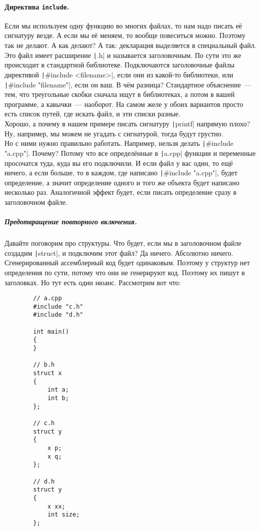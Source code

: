 \documentclass{article}
\begin{document}
    \paragraph{Директива \texttt{include}.}
    Если мы используем одну функцию во многих файлах, то нам надо писать её сигнатуру везде. А если мы её меняем, то вообще повеситься можно. Поэтому так не делают. А как делают? А так: декларация выделяется в специальный файл. Это файл имеет расширение \texttt|.h| и называется заголовочным. По сути это же происходит в стандартной библиотеке. Подключаются заголовочные файлы директивой \texttt|#include <filename>|, если они из какой-то библиотеки, или \texttt|#include "filename"|, если он ваш. В чём разница? Стандартное объяснение~--- тем, что треугольные скобки сначала ищут в библиотеках, а потом в вашей программе, а кавычки~--- наоборот. На самом желе у обоих вариантов просто есть список путей, где искать файл, и эти списки разные.\\
    Хорошо, а почему в нашем примере писать сигнатуру \texttt|printf| напрямую плохо? Ну, например, мы можем не угадать с сигнатурой, тогда будут грустно.\\
    Но с ними нужно правильно работать. Например, нельзя делать \texttt|#include "a.cpp"|. Почему? Потому что все определённые в \texttt|a.cpp| функции и переменные просочатся туда, куда вы его подключили. И если файл у вас один, то ещё ничего, а если больше, то в каждом, где написано \texttt|#include "a.cpp"|, будет определение, а значит определение одного и того же объекта будет написано несколько раз. Аналогичной эффект будет, если писать определение сразу в заголовочном файле.
    \subparagraph{Предотвращение повторного включения.}
    Давайте поговорим про структуры. Что будет, если мы в заголовочном файле создадим \texttt|struct|, и подключим этот файл? Да ничего. Абсолютно ничего. Сгенерированный ассемблерный код будет одинаковым. Поэтому у структур нет определения по сути, потому что они не генерируют код. Поэтому их пишут в заголовках. Но тут есть один нюанс. Рассмотрим вот что:
    \begin{verbatim}
        // a.cpp
        #include "c.h"
        #include "d.h"

        int main()
        {
        }

        // b.h
        struct x
        {
            int a;
            int b;
        };

        // c.h
        struct y
        {
            x p;
            x q;
        };

        // d.h
        struct y
        {
            x xx;
            int size;
        };
    \end{verbatim}
\end{document}
